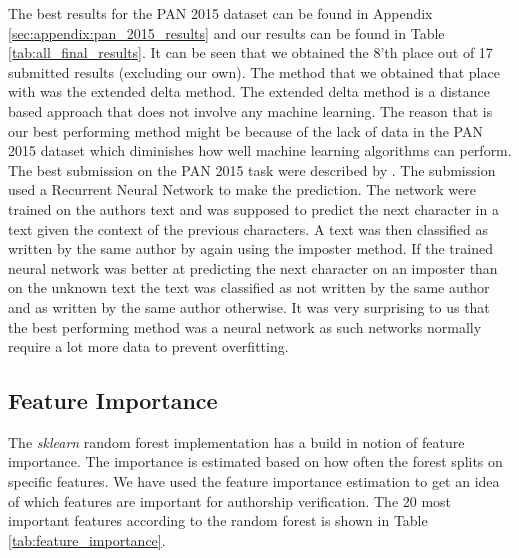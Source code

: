 The best results for the PAN 2015 dataset can be found in Appendix
\ref{sec:appendix:pan_2015_results} and our results can be found in Table
\ref{tab:all_final_results}. It can be seen that we obtained the 8'th place
out of 17 submitted results (excluding our own). The method that we obtained
that place with was the extended delta method. The extended delta method is a
distance based approach that does not involve any machine learning. The reason
that is our best performing method might be because of the lack of data in
the PAN 2015 dataset which diminishes how well machine learning algorithms
can perform. The best submission on the PAN 2015 task were described by
\cite{bagnall:2015}. The submission used a Recurrent Neural Network to make
the prediction. The network were trained on the authors text and was supposed
to predict the next character in a text given the context of the previous
characters. A text was then classified as written by the same author by again
using the imposter method. If the trained neural network was better at
predicting the next character on an imposter than on the unknown text the text
was classified as not written by the same author and as written by the same
author otherwise. It was very surprising to us that the best performing method
was a neural network as such networks normally require a lot more data to
prevent overfitting.




\subsection{Feature Importance}
The \textit{sklearn} random forest implementation has a build in notion of
feature importance. The importance is estimated based on how often the forest
splits on specific features. We have used the feature importance estimation to
get an idea of which features are important for authorship verification. The 20
most important features according to the random forest is shown in Table
\ref{tab:feature_importance}.


